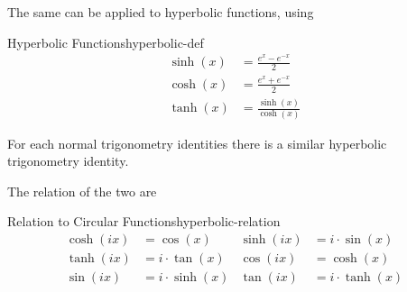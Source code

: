 \documentclass[a4paper]{article}
\begin{document}
The same can be applied to hyperbolic functions, using

\begin{mydefinition}{Hyperbolic Functions}{hyperbolic-def}
\begin{align}
    \sinh(x) & = \frac{e^x - e^{-x}}{2}    \\
    \cosh(x) & = \frac{e^x + e^{-x}}{2}    \\
    \tanh(x) & = \frac{\sinh(x)}{\cosh(x)}
\end{align}
\end{mydefinition}

For each normal trigonometry identities there is a similar hyperbolic trigonometry identity.

The relation of the two are
\begin{mytheorem}{Relation to Circular Functions}{hyperbolic-relation}
    \begin{align*}
        \cosh(ix) & = \cos(x)          & \sinh(ix) & = i \cdot \sin(x)  \\
        \tanh(ix) & = i \cdot \tan(x)  & \cos(ix)  & = \cosh(x)         \\
        \sin(ix)  & = i \cdot \sinh(x) & \tan(ix)  & = i \cdot \tanh(x)
    \end{align*}
\end{mytheorem}
\end{document}

